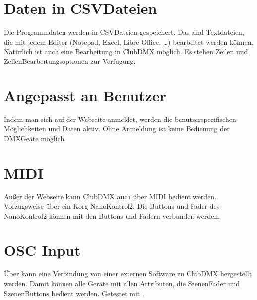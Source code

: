 \documentclass[letterpaper,10pt,ngerman]{sphinxmanual}
\begin{document}
\section{Daten in CSV\sphinxhyphen{}Dateien}
\label{\detokenize{features:daten-in-csv-dateien}}
Die Programmdaten werden in CSV\sphinxhyphen{}Dateien gespeichert. Das sind Textdateien,
die mit jedem Editor (Notepad, Excel, Libre Office, …) bearbeitet werden
können. Natürlich ist auch eine Bearbeitung in ClubDMX möglich.
Es stehen Zeilen\sphinxhyphen{} und Zellen\sphinxhyphen{}Bearbeitungsoptionen zur Verfügung.


\section{Angepasst an Benutzer}
\label{\detokenize{features:angepasst-an-benutzer}}
Indem man sich auf der Webseite anmeldet, werden die benutzerspezifischen
Möglichkeiten und Daten aktiv. Ohne Anmeldung ist keine Bedienung der
DMX\sphinxhyphen{}Geäte möglich.


\section{MIDI}
\label{\detokenize{features:midi}}
Außer der Webseite kann ClubDMX auch über MIDI bedient werden. Vorzugsweise über
ein Korg NanoKontrol\sphinxhyphen{}2. Die Buttons und Fader des NanoKontrol2 können mit den
Buttons und Fadern verbunden werden.


\section{OSC Input}
\label{\detokenize{features:osc-input}}
Über 
kann eine Verbindung von einer externen Software zu ClubDMX hergestellt
werden. Damit können alle Geräte mit allen Attributen, die Szenen\sphinxhyphen{}Fader und
Szenen\sphinxhyphen{}Buttons bedient werden. Getestet mit
 .
\end{document}

